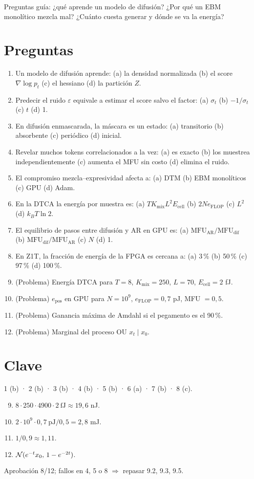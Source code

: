 \documentclass[11pt,a4paper]{article}
\begin{document}
\noindent Preguntas guía: ¿qué aprende un modelo de difusión? ¿Por qué un EBM monolítico mezcla mal? ¿Cuánto cuesta generar y dónde se va la energía?
\section*{Preguntas}
\begin{enumerate}
\item Un modelo de difusión aprende: (a) la densidad normalizada (b) el score $\nabla\log p_t$ (c) el hessiano (d) la partición $Z$.
\item Predecir el ruido $\varepsilon$ equivale a estimar el score salvo el factor: (a) $\sigma_t$ (b) $-1/\sigma_t$ (c) $t$ (d) 1.
\item En difusión enmascarada, la máscara es un estado: (a) transitorio (b) absorbente (c) periódico (d) inicial.
\item Revelar muchos tokens correlacionados a la vez: (a) es exacto (b) los muestrea independientemente (c) aumenta el MFU sin costo (d) elimina el ruido.
\item El compromiso mezcla--expresividad afecta a: (a) DTM (b) EBM monolíticos (c) GPU (d) Adam.
\item En la DTCA la energía por muestra es: (a) $TK_{\text{mix}}L^2E_{\text{cell}}$ (b) $2N e_{\text{FLOP}}$ (c) $L^2$ (d) $k_BT\ln2$.
\item El equilibrio de pasos entre difusión y AR en GPU es: (a) $\text{MFU}_{\text{AR}}/\text{MFU}_{\text{dif}}$ (b) $\text{MFU}_{\text{dif}}/\text{MFU}_{\text{AR}}$ (c) $N$ (d) 1.
\item En Z1T, la fracción de energía de la FPGA es cercana a: (a) 3\,\% (b) 50\,\% (c) 97\,\% (d) 100\,\%.
\item (Problema) Energía DTCA para $T=8$, $K_{\text{mix}}=250$, $L=70$, $E_{\text{cell}}=2$ fJ.
\item (Problema) $e_{\text{pos}}$ en GPU para $N=10^9$, $e_{\text{FLOP}}=0{,}7$ pJ, MFU $=0{,}5$.
\item (Problema) Ganancia máxima de Amdahl si el pegamento es el 90\,\%.
\item (Problema) Marginal del proceso OU $x_t\mid x_0$.
\end{enumerate}
\newpage
\section*{Clave}
1 (b) · 2 (b) · 3 (b) · 4 (b) · 5 (b) · 6 (a) · 7 (b) · 8 (c).
\begin{enumerate}\setcounter{enumi}{8}
\item $8\cdot250\cdot4900\cdot2\ \text{fJ}\approx19{,}6$ nJ.
\item $2\cdot10^9\cdot0{,}7\ \text{pJ}/0{,}5=2{,}8$ mJ.
\item $1/0{,}9\approx1{,}11$.
\item $\mathcal{N}(e^{-t}x_0,\,1-e^{-2t})$.
\end{enumerate}
Aprobación 8/12; fallos en 4, 5 o 8 $\Rightarrow$ repasar 9.2, 9.3, 9.5.
\end{document}
